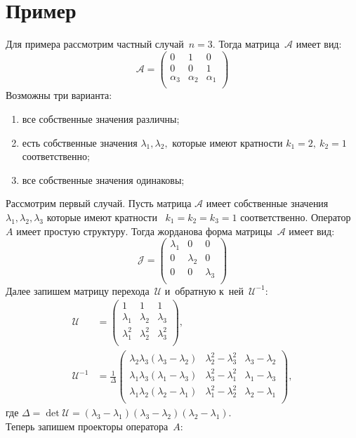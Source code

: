 \section{Пример}
Для примера рассмотрим частный случай~$n=3$. Тогда матрица~$\mathcal{A}$ имеет вид:
$$
 \mathcal{A} = 
 \begin{pmatrix}
  0 & 1 & 0\\
  0 & 0 & 1 \\
  \alpha_3 & \alpha_2 & \alpha_1 \\
 \end{pmatrix}
$$
Возможны три варианта:
\begin{enumerate}
\item все собственные значения различны;
\item есть собственные значения $\lambda_1, \lambda_2,$ которые имеют кратности ${k_1=2},~{k_2=1}$ соответственно; 
\item все собственные значения одинаковы;        
\end{enumerate}

Рассмотрим первый случай.
Пусть матрица $\mathcal{A}$ имеет собственные значения $\lambda_1, \lambda_2, \lambda_3$ которые имеют кратности~ $k_1=k_2=k_3=1$ соответственно. Оператор $A$ имеет простую структуру. Тогда жорданова форма матрицы~$\mathcal{A}$ имеет вид:
$$
 \mathcal{J} = 
 \begin{pmatrix}
  \lambda_1 & 0 & 0\\
  0 & \lambda_2 & 0 \\
  0 & 0 & \lambda_3 \\
 \end{pmatrix}
$$
Далее запишем матрицу перехода~$\mathcal{U}$ и~обратную к~ней~$\mathcal{U}^{-1}$:
$$
\begin{aligned}
 \mathcal{U} &= 
 \begin{pmatrix}
  	1 & 1 & 1\\
  	\lambda_1 & \lambda_2 & \lambda_3 \\
  	\lambda_1^2 & \lambda_2^2 & \lambda_3^2 \\
 \end{pmatrix}, \\
 \mathcal{U}^{-1} &= \frac{1}{\Delta} 
 \begin{pmatrix}
  	\lambda_2\lambda_3(\lambda_3-\lambda_2) & \lambda_2^2-\lambda_3^2 & \lambda_3-\lambda_2\\
  	\lambda_1\lambda_3(\lambda_1-\lambda_3) & \lambda_3^2-\lambda_1^2 & \lambda_1-\lambda_3\\
  	\lambda_1\lambda_2(\lambda_2-\lambda_1) & \lambda_1^2-\lambda_2^2 & \lambda_2-\lambda_1\\
 \end{pmatrix},
\end{aligned}
$$
где $\Delta = \det \mathcal{U} = (\lambda_3-\lambda_1)(\lambda_3-\lambda_2)(\lambda_2-\lambda_1).$ \\
Теперь запишем проекторы оператора~$A$:

